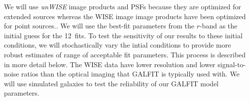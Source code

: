 \documentclass[11pt, preprint]{aastex}
\begin{document}
{We will use {\it unWISE} image products and PSFs \citep{lang14}
because they are optimized for extended sources whereas the WISE
image image products have been optimized for point sources..
We will use the best-fit parameters from the $r$-band as the initial
guess for the 12\micron \ fits. To test the sensitivity of our results to these
initial conditions, we will stochastically vary the intial
conditions to provide more robust estimates of range of acceptable
fit parameters.  This process is described in more detail below.
The WISE  data have lower resolution and
lower signal-to-noise ratios than the optical imaging that
GALFIT is typically used with. 
We will use simulated galaxies to test the reliability of our GALFIT
model parameters.


}
\end{document}
